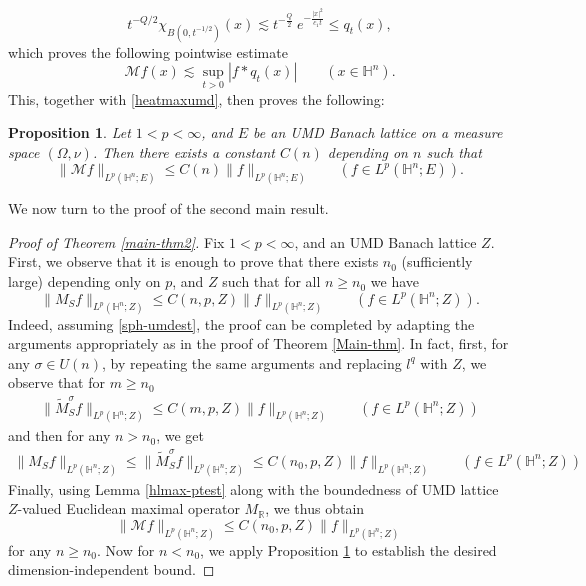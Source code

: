 \documentclass[11pt]{amsart}
\newcommand {\R}{\mathbb R}
\newcommand{\Ha}{\mathbb{H}^n}
\newtheorem{prop}[theorem]{Proposition}
\theoremstyle{definition}
\numberwithin{equation}{section}
\begin{document}
   $$t^{-Q/2}\chi_{B(0, t^{-1/2})}(x)\lesssim t^{-\frac{Q}{2}}~e^{-\frac{|x|^2}{c_1t}}\leq q_t(x),$$
   which proves the following pointwise estimate 
   $$\mathcal{M}f(x)\lesssim \sup_{t>0}|f\ast q_t(x)|\quad\quad (x\in \Ha).$$
   This, together with \eqref{heatmaxumd}, then proves the following: 
   \begin{prop}
   \label{withdimumdbdd}
       Let $1<p<\infty$, and $E$ be an UMD Banach lattice on a measure space $(\Omega, \nu)$. Then there exists a constant $C(n)$ depending on $n$ such that 
       $$\|\mathcal{M}f\|_{L^p(\Ha; E)}\leq C(n) \|f\|_{L^p(\Ha; E)}\quad\quad (f\in L^p(\Ha; E)).$$
   \end{prop}
    We now turn to the proof of the second main result. 
    \begin{proof}[Proof of Theorem \ref{main-thm2}]
        Fix $1<p<\infty$, and an UMD Banach lattice $Z.$ First, we observe that it is enough to prove that there exists $n_0$ (sufficiently large) depending only on $p$, and $Z$ such that for all $n\geq  n_0$ we have  
        \begin{equation}
            \label{sph-umdest}
            \|M_Sf\|_{L^p(\Ha; Z)}\leq C(n,p,Z) \|f\|_{L^p(\Ha; Z)}\quad\quad (f\in L^p(\Ha; Z)).
        \end{equation}
        Indeed, assuming \eqref{sph-umdest}, the proof can be completed by adapting the arguments appropriately as in the proof of Theorem \ref{Main-thm}. In fact,  first, for any $\sigma\in U(n)$, by repeating the same arguments and replacing $l^q$ with $Z$, we observe that for $m\geq n_0$
        \begin{align*}
            \|\widetilde{M}^{\sigma}_Sf\|_{L^p(\Ha; Z)}\leq C(m,p,Z) \|f\|_{L^p(\Ha; Z)}\quad\quad (f\in L^p(\Ha; Z))
        \end{align*}
        and then for any $n>n_0$, we get 
        \begin{align*}
          \|M_Sf\|_{L^p(\Ha; Z)}\leq   \|\widetilde{M}^{\sigma}_Sf\|_{L^p(\Ha; Z)}\leq C(n_0,p,Z) \|f\|_{L^p(\Ha; Z)}\quad\quad (f\in L^p(\Ha; Z))
        \end{align*}
        Finally, using Lemma \ref{hlmax-ptest} along with the boundedness of UMD lattice $Z$-valued Euclidean maximal operator $M_{\R}$, we thus obtain 
        $$ \|\mathcal{M}f\|_{L^p(\Ha; Z)}\leq C(n_0,p,Z) \|f\|_{L^p(\Ha; Z)}$$
        for any $n\geq n_0.$ Now for $n<n_0$, we apply Proposition \ref{withdimumdbdd} to establish the desired dimension-independent bound. 
        

\end{proof}
\end{document}
